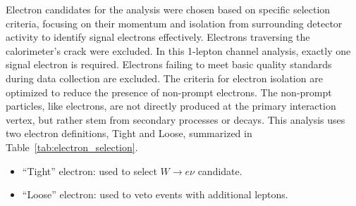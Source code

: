 \label{subsec:electron_selection}
Electron candidates for the analysis were chosen based on specific selection criteria, focusing on their momentum and isolation from surrounding detector activity to identify signal electrons effectively. Electrons traversing the calorimeter's crack were excluded. 
In this 1-lepton channel analysis, exactly one signal electron is required. Electrons failing to meet basic quality standards during data collection are excluded.
The criteria for electron isolation are optimized to reduce the presence of non-prompt electrons.
The non-prompt particles, like electrons, are not directly produced at the primary interaction vertex, but rather stem from secondary processes or decays.
This analysis uses two electron definitions, Tight and Loose, summarized in Table~\ref{tab:electron_selection}.
\begin{itemize}
\item ``Tight'' electron: used to select $W\to e \nu$ candidate.
\item ``Loose'' electron: used to veto events with additional leptons.
\end{itemize}

\begin{table}[ht]
\caption{Summary of Electron Selections}
\label{tab:electron_selection}
\end{table}

\vspace{1cm}

